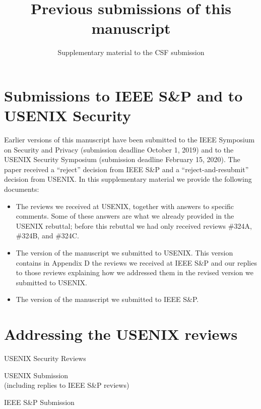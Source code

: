 \documentclass[a4paper]{scrartcl}
\title{Previous submissions of this manuscript}
\subtitle{Supplementary material to the CSF submission}
\date{}
\author{}
\begin{document}
  \maketitle

\section*{Submissions to IEEE S\&P and to USENIX Security}
Earlier versions of this manuscript have been submitted 
to the IEEE Symposium on Security and Privacy (submission deadline October 1, 2019)
and to the USENIX Security Symposium (submission deadline February 15, 2020).
The paper received a ``reject'' decision from IEEE S\&P and a ``reject-and-resubmit''
decision from USENIX. In this supplementary material we provide the following documents:
\begin{itemize}
  \item The reviews we received at USENIX, together with answers to specific comments.
    Some of these answers are what we already provided in the USENIX rebuttal;
    before this rebuttal we had only received reviews \#324A, \#324B, and \#324C.
  \item The version of the manuscript we submitted to USENIX. This version
    contains in Appendix D the reviews we received at IEEE S\&P and our replies
    to those reviews explaining how we addressed them in the revised version
    we submitted to USENIX.
  \item The version of the manuscript we submitted to IEEE S\&P.
\end{itemize}


\section*{Addressing the USENIX reviews}

\newpage
\vspace*{7cm}
\begin{center}
  \textsf{
\Huge{USENIX Security Reviews}
}
\end{center}
\newpage









\newpage
\vspace*{7cm}
\begin{center}
  \textsf{
\Huge{USENIX Submission}\\
\large{(including replies to IEEE S\&P reviews)}
}
\end{center}
\newpage



\newpage
\vspace*{7cm}
\begin{center}
  \textsf{
\Huge{IEEE S\&P Submission}\\
}
\end{center}
\newpage


\end{document}
